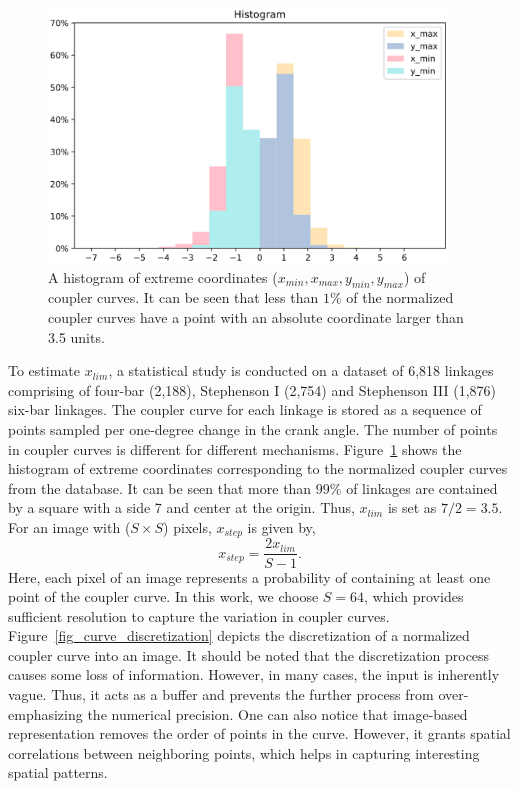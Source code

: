 \begin{figure}
\centering
\includegraphics[width=300pt]{idetc-20/figure/fig_histogram.eps}
  \caption{A histogram of extreme coordinates ($x_{min}, x_{max}, y_{min}, y_{max}$) of coupler curves. It can be seen that less than $1\%$ of the normalized coupler curves have a point with an absolute coordinate larger than 3.5 units.}
\label{fig_histogram}
\end{figure}




To estimate $x_{lim}$, a statistical study is conducted on a dataset of 6,818 linkages comprising of four-bar (2,188), Stephenson I (2,754) and Stephenson III (1,876) six-bar linkages. The coupler curve for each linkage is stored as a sequence of points sampled per one-degree change in the crank angle. The number of points in coupler curves is different for different mechanisms. Figure~\ref{fig_histogram} shows the histogram of extreme coordinates corresponding to the normalized coupler curves from the database. It can be seen that more than $99\%$ of linkages are contained by a square with a side 7 and center at the origin. Thus, $x_{lim}$ is set as $7/2 = 3.5$. 
For an image with ($S\times S$) pixels, $x_{step}$ is given by,
\begin{equation*}
   x_{step} = \frac{2x_{lim}}{S - 1}.
\end{equation*}
Here, each pixel of an image represents a probability of containing at least one point of the coupler curve.
In this work, we choose $S = 64$, which provides sufficient resolution to capture the variation in coupler curves. 
Figure~\ref{fig_curve_discretization} depicts the discretization of a normalized coupler curve into an image.
It should be noted that the discretization process causes some loss of information. However, in many cases, the input is inherently vague. Thus, it acts as a buffer and prevents the further process from over-emphasizing the numerical precision. One can also notice that image-based representation removes the order of points in the curve. However, it grants spatial correlations between neighboring points, which helps in capturing interesting spatial patterns.



